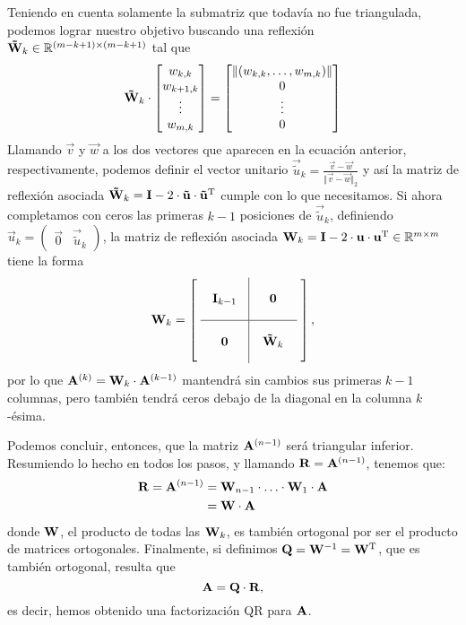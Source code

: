 Teniendo en cuenta solamente la submatriz que todavía no fue triangulada,
podemos lograr nuestro objetivo buscando una reflexión $\mathbf{\tilde W}_k
\in \mathbb{R}^{(m-k+1) \times (m-k+1)} $ tal que
\[
\mathbf{\tilde W}_k \cdot
    \begin{bmatrix} w_{k,k} \\ w_{k+1,k} \\ \vdots \\ w_{m,k} \end{bmatrix}
=  \begin{bmatrix} \Vert (w_{k,k}, \dots, w_{m,k}) \Vert \\ 0 \\ \vdots \\ 0 \end{bmatrix}
\]
Llamando $\vec{v}$ y $\vec{w}$ a los dos vectores que aparecen en la ecuación
anterior, respectivamente, podemos definir el vector unitario
$\vec{\tilde u}_k = \frac{\vec{v} - \vec{w}}{\Vert \vec{v} - \vec{w} \Vert_2}$
y así la matriz de reflexión asociada $\mathbf{\tilde W}_k = \mathbf{I} - 2 \cdot
\mathbf{\tilde u} \cdot \mathbf{\tilde u}^{\mathrm{T}}$ cumple con lo que necesitamos.
Si ahora completamos con ceros las primeras $k-1$ posiciones de $\vec{\tilde u}_k$, definiendo $\vec{u}_k = ( \begin{array}{c|c} \vec{0} & \vec{\tilde u}_k \end{array} )$, la matriz de reflexión asociada $\mathbf{W}_k = \mathbf{I} - 2 \cdot
\mathbf{u} \cdot \mathbf{u}^{\mathrm{T}} \in \mathbb{R}^{m \times m}$ tiene la forma
\[
\mat{W}_k = \left[ \hspace{.1cm} \begin{array}{c|c}
    \matbox{.6cm}{1cm}{\mat{I}_{k-1}}
        & \matbox{.6cm}{1cm}{\mat{0}} \\ \hline
    \matbox{.6cm}{1cm}{\mat{0}}
        & \matbox{.6cm}{1cm}{\mat{\tilde W}_k}
\end{array} \hspace{.1cm} \right],
\]
por lo que $\mathbf{A}^{(k)} = \mathbf{W}_k \cdot \mathbf{A}^{(k-1)}$ mantendrá sin
cambios sus primeras $k-1$ columnas, pero también tendrá ceros debajo de la
diagonal en la columna $k$-ésima.

Podemos concluir, entonces, que la matriz $\mathbf{A}^{(n-1)}$ será triangular
inferior. Resumiendo lo hecho en todos los pasos, y llamando
$\mathbf{R} = \mathbf{A}^{(n-1)}$, tenemos que:
\[ \begin{aligned}
    \mathbf{R} = \mathbf{A}^{(n-1)}
    &= \mathbf{W}_{n-1} \cdot \ldots \cdot \mathbf{W}_{1}
        \cdot \mathbf{A} \\
    &= \mathbf{W} \cdot \mathbf{A}
\end{aligned} \]
donde $\mathbf{W}$, el producto de todas las $\mathbf{W}_k$, es también ortogonal
por ser el producto de matrices ortogonales.
Finalmente, si definimos $\mathbf{Q} = \mathbf{W}^{-1} = \mathbf{W}^{\mathrm{T}}$, que es
también ortogonal, resulta que
\[ \mathbf{A} = \mathbf{Q} \cdot \mathbf{R}, \]
es decir, hemos obtenido una factorización QR para $\mathbf{A}$.

